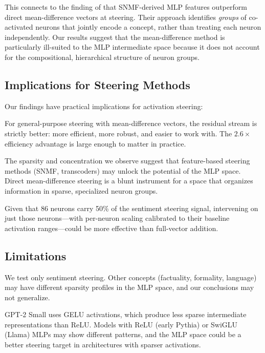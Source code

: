 This connects to the finding of \citet{shafran2025decomposing} that SNMF-derived MLP features outperform direct mean-difference vectors at steering. Their approach identifies \emph{groups} of co-activated neurons that jointly encode a concept, rather than treating each neuron independently. Our results suggest that the mean-difference method is particularly ill-suited to the MLP intermediate space because it does not account for the compositional, hierarchical structure of neuron groups.

\subsection{Implications for Steering Methods}

Our findings have practical implications for activation steering:

For general-purpose steering with mean-difference vectors, the residual stream is strictly better: more efficient, more robust, and easier to work with. The $2.6\times$ efficiency advantage is large enough to matter in practice.

The sparsity and concentration we observe suggest that feature-based steering methods (\eg SNMF, transcoders) may unlock the potential of the MLP space. Direct mean-difference steering is a blunt instrument for a space that organizes information in sparse, specialized neuron groups.

Given that 86 neurons carry 50\% of the sentiment steering signal, intervening on just those neurons---with per-neuron scaling calibrated to their baseline activation ranges---could be more effective than full-vector addition.

\subsection{Limitations}

We test only sentiment steering. Other concepts (\eg factuality, formality, language) may have different sparsity profiles in the MLP space, and our conclusions may not generalize.

GPT-2 Small uses GELU activations, which produce less sparse intermediate representations than ReLU. Models with ReLU (\eg early Pythia) or SwiGLU (\eg Llama) MLPs may show different patterns, and the MLP space could be a better steering target in architectures with sparser activations.

